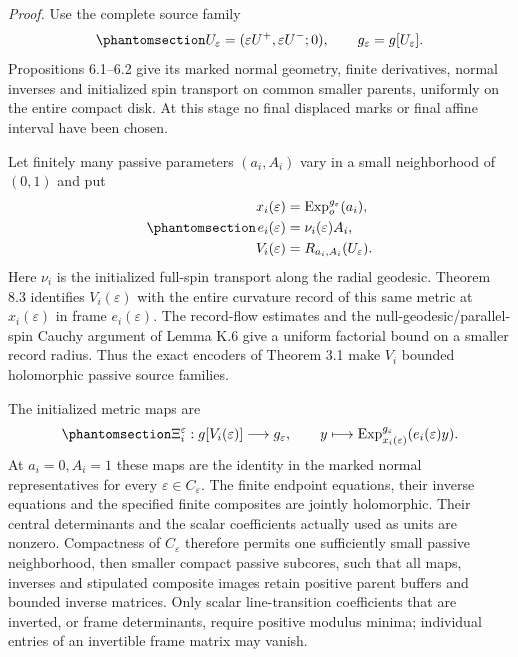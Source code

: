 \documentclass[
  english,
  11pt,
  reqno]{amsart}
\begin{document}
\emph{Proof.} Use the complete source family
\begin{equation}\protect\phantomsection\label{eq:schw-bc-central-amplitude-family}{
 U_\varepsilon=(\varepsilon U^+,\varepsilon U^-;0),\qquad
 g_\varepsilon=g[U_\varepsilon].
}\end{equation} Propositions 6.1--6.2 give its marked normal geometry,
finite derivatives, normal inverses and initialized spin transport on
common smaller parents, uniformly on the entire compact disk. At this
stage no final displaced marks or final affine interval have been
chosen.

Let finitely many passive parameters \((a_i,A_i)\) vary in a small
neighborhood of \((0,1)\) and put
\begin{equation}\protect\phantomsection\label{eq:schw-bc-compatible-rebased-records}{
 \begin{aligned}
 x_i(\varepsilon)&=\operatorname{Exp}^{g_\varepsilon}_o(a_i),\\
 e_i(\varepsilon)&=\nu_i(\varepsilon)A_i,\\
 V_i(\varepsilon)&=R_{a_i,A_i}(U_\varepsilon).
 \end{aligned}
}\end{equation} Here \(\nu_i\) is the initialized full-spin transport
along the radial geodesic. Theorem 8.3 identifies \(V_i(\varepsilon)\)
with the entire curvature record of this same metric at
\(x_i(\varepsilon)\) in frame \(e_i(\varepsilon)\). The record-flow
estimates and the null-geodesic/parallel-spin Cauchy argument of Lemma
K.6 give a uniform factorial bound on a smaller record radius. Thus the
exact encoders of Theorem 3.1 make \(V_i\) bounded holomorphic passive
source families.

The initialized metric maps are
\begin{equation}\protect\phantomsection\label{eq:schw-bc-compatible-metric-maps}{
 \Xi_i^\varepsilon:g[V_i(\varepsilon)]\longrightarrow g_\varepsilon,
 \qquad
 y\longmapsto\operatorname{Exp}^{g_\varepsilon}_{x_i(\varepsilon)}
                                      (e_i(\varepsilon)y).
}\end{equation} At \(a_i=0,A_i=1\) these maps are the identity in the
marked normal representatives for every
\(\varepsilon\in C_\varepsilon\). The finite endpoint equations, their
inverse equations and the specified finite composites are jointly
holomorphic. Their central determinants and the scalar coefficients
actually used as units are nonzero. Compactness of \(C_\varepsilon\)
therefore permits one sufficiently small passive neighborhood, then
smaller compact passive subcores, such that all maps, inverses and
stipulated composite images retain positive parent buffers and bounded
inverse matrices. Only scalar line-transition coefficients that are
inverted, or frame determinants, require positive modulus minima;
individual entries of an invertible frame matrix may vanish.
\end{document}
